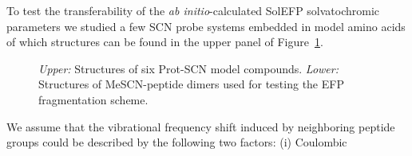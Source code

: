 \documentclass[a4paper,titlepage,twoside,fleqn,12pt]{book}
\begin{document}
\begin{refsection}
To test the transferability of the \emph{ab initio}\hyp{}calculated SolEFP
solvatochromic parameters we studied a few SCN probe
systems embedded in model amino acids of which structures
can be found in the upper panel of Figure~\ref{f:mescn-prot-struct}. 
%
\begin{figure}[t!]
\centering
\setlength\fboxsep{0.4pt}
\setlength\fboxrule{0.5pt}
\caption{
\emph{Upper:} Structures of six Prot-SCN model compounds.
\emph{Lower:} Structures of MeSCN-peptide dimers used for testing the EFP fragmentation
scheme.
\label{f:mescn-prot-struct}}
\end{figure}
%
We assume that the vibrational
frequency shift induced by neighboring peptide groups could
be described by the following two factors: (i) Coulombic

\end{refsection}
\end{document}
